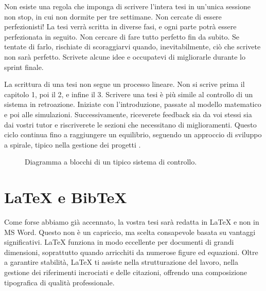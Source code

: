\documentclass{article}
\begin{document}
Non esiste una regola che imponga di scrivere l’intera tesi in un’unica sessione non stop, in cui non dormite per tre settimane. Non cercate di essere perfezionisti! La tesi verrà scritta in diverse fasi, e ogni parte potrà essere perfezionata in seguito. Non cercare di fare tutto perfetto fin da subito. Se tentate di farlo, rischiate di scoraggiarvi quando, inevitabilmente, ciò che scrivete non sarà perfetto. Scrivete alcune idee e occupatevi di migliorarle durante lo sprint finale.

La scrittura di una tesi non segue un processo lineare. Non si scrive prima il capitolo 1, poi il 2, e infine il 3. Scrivere una tesi è più simile al controllo di un sistema in retroazione. Iniziate con l’introduzione, passate al modello matematico e poi alle simulazioni. Successivamente, riceverete feedback sia da voi stessi sia dai vostri tutor e riscriverete le sezioni che necessitano di miglioramenti. Questo ciclo continua fino a raggiungere un equilibrio, seguendo un approccio di sviluppo a spirale, tipico nella gestione dei progetti \cite{boehm1998using}.
\begin{figure}[H]
\begin{center}
\end{center}
\caption{Diagramma a blocchi di un tipico sistema di controllo.}
\label{fig:control-system}
\end{figure}

\section{\LaTeX{} e BibTeX}
Come forse abbiamo già accennato, la vostra tesi sarà redatta in \LaTeX{} e non in MS Word. Questo non è un capriccio, ma scelta consapevole basata su vantaggi significativi. \LaTeX{} funziona in modo eccellente per documenti di grandi dimensioni, soprattutto quando arricchiti da numerose figure ed equazioni. Oltre a garantire stabilità, \LaTeX{} ti assiste nella strutturazione del lavoro, nella gestione dei riferimenti incrociati e delle citazioni, offrendo una composizione tipografica di qualità professionale.
\end{document}
